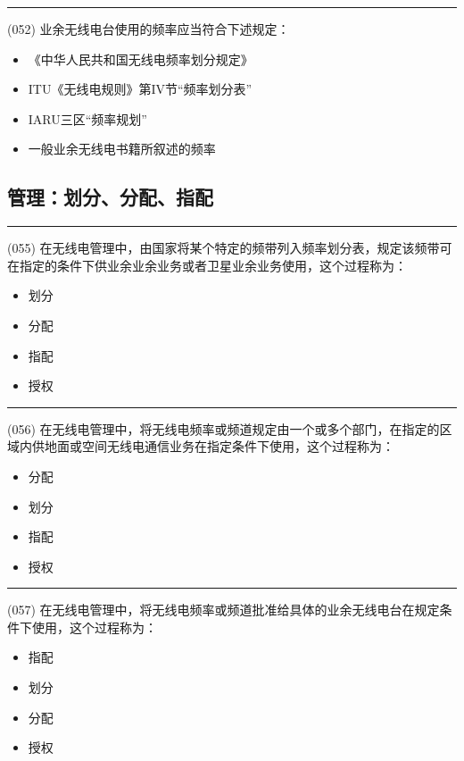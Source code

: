 \documentclass[twocolumn,hyperref,UTF8]{ctexart}  %
\begin{document}
\noindent\rule{0.5\textwidth}{1pt}
\heiti (052) 业余无线电台使用的频率应当符合下述规定： \songti {\color{gray} [LK0047] }
\begin{itemize}
	\item  《中华人民共和国无线电频率划分规定》
	\item  ITU《无线电规则》第IV节“频率划分表”
	\item  IARU三区“频率规划”
	\item  一般业余无线电书籍所叙述的频率
\end{itemize}







\clearpage
\subsection{管理：划分、分配、指配}


\noindent\rule{0.5\textwidth}{1pt}
\heiti (055) 在无线电管理中，由国家将某个特定的频带列入频率划分表，规定该频带可在指定的条件下{\color{cyan}供业余业余业务或者卫星业余业务使用}，这个过程称为： \songti {\color{gray} [LK0113] }
\begin{itemize}
	\item  {\color{LimeGreen}划分}
	\item  分配
	\item  指配
	\item  授权
\end{itemize}


\noindent\rule{0.5\textwidth}{1pt}
\heiti (056) 在无线电管理中，将无线电频率或频道{\color{cyan}规定由一个或多个部门}，{\color{cyan}在指定的区域内}供地面或空间无线电通信业务在指定条件下使用，这个过程称为： \songti {\color{gray} [LK0114] }
\begin{itemize}
	\item  {\color{LimeGreen}分配}
	\item  划分
	\item  指配
	\item  授权
\end{itemize}


\noindent\rule{0.5\textwidth}{1pt}
\heiti (057) 在无线电管理中，将无线电频率或频道{\color{cyan}批准给具体的业余无线电台}在规定条件下使用，这个过程称为： \songti {\color{gray} [LK0115] }
\begin{itemize}
	\item  {\color{LimeGreen}指配}
	\item  划分
	\item  分配
	\item  授权
\end{itemize}
\end{document}
